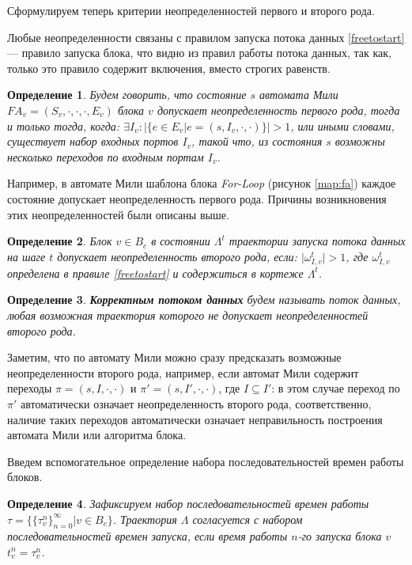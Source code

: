 \documentclass[10pt,a4paper]{article}
\newtheorem{defen}{Определение}
\newcommand{\FA}{F\!A}
\begin{document}
  Сформулируем теперь критерии неопределенностей первого и второго рода.
  
  Любые неопределенности связаны с правилом запуска потока данных \eqref{freetostart} --- правило запуска блока, что видно из правил работы потока данных, так как,
  только это правило содержит включения, вместо строгих равенств.
  \begin{defen}
    Будем говорить, что состояние $s$ автомата Мили $\FA_v = (S_v, \cdot, \cdot, \cdot, E_v)$ блока $v$ допускает неопределенность первого рода, тогда и только тогда, когда:
    $\exists I_v: \lvert \{e \in E_v \vert e = (s, I_v, \cdot, \cdot) \} \rvert > 1$, или иными словами, существует набор входных портов $I_v$, такой что, из состояния $s$ возможны
    несколько переходов по входным портам $I_v$.
  \end{defen}
  
  Например, в автомате Мили шаблона блока \textit{For-Loop} (рисунок \ref{map:fa}) каждое состояние допускает неопределенность первого рода.
  Причины возникновения этих неопределенностей были описаны выше.
 
  \begin{defen}
    Блок $v \in B_c$ в состоянии $\Lambda^t$ траектории запуска потока данных на шаге $t$ допускает неопределенность второго рода, если:
    $\lvert \omega^t_{I, v} \rvert > 1$, где $\omega^t_{I, v}$ определена в правиле \eqref{freetostart} и содержиться в кортеже $\Lambda^t$.
  \end{defen}
  
  \begin{defen}
    \textbf{Корректным потоком данных} будем называть поток данных, любая возможная траектория которого не допускает неопределенностей второго рода.
  \end{defen}
  
  Заметим, что по автомату Мили можно сразу предсказать возможные неопределенности второго рода, например, если автомат Мили содержит переходы
  $\pi = (s, I, \cdot, \cdot)$ и $\pi' = (s, I', \cdot, \cdot)$,
  где $I \subseteq I'$: в этом случае переход по $\pi'$ автоматически означает неопределенность второго рода,
  соответственно, наличие таких переходов автоматически означает неправильность построения автомата Мили или алгоритма блока.
  
  Введем вспомогательное определение набора последовательностей времен работы блоков.
  \begin{defen}
    Зафиксируем набор последовательностей времен работы $\tau = \{\{\tau^n_v\}^{\infty}_{n = 0} \vert v \in B_c\}$.
    Траектория $\Lambda$ согласуется с набором последовательностей времен запуска, если время работы $n$-го запуска блока $v$ $t^n_v = \tau^n_v$.
  \end{defen}
  
\end{document}
